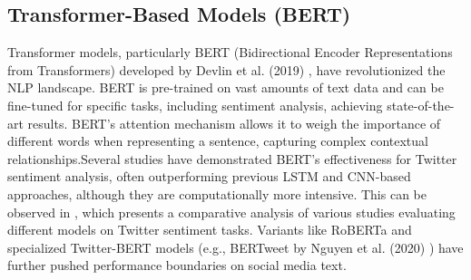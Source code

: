 \subsection{Transformer-Based Models (BERT)
}


Transformer models, particularly BERT (Bidirectional Encoder Representations from Transformers) developed by Devlin et al. (2019) \cite{devlin2019bert}, have revolutionized the NLP landscape. BERT is pre-trained on vast amounts of text data and can be fine-tuned for specific tasks, including sentiment analysis, achieving state-of-the-art results. BERT's attention mechanism allows it to weigh the importance of different words when representing a sentence, capturing complex contextual relationships.Several studies have demonstrated BERT's effectiveness for Twitter sentiment analysis, often outperforming previous LSTM and CNN-based approaches, although they are computationally more intensive. This can be observed in \cite{article}, which presents a comparative analysis of various studies evaluating different models on Twitter sentiment tasks.  Variants like RoBERTa and specialized Twitter-BERT models (e.g., BERTweet by Nguyen et al. (2020) \cite{nguyen2020bertweet}) have further pushed performance boundaries on social media text.

